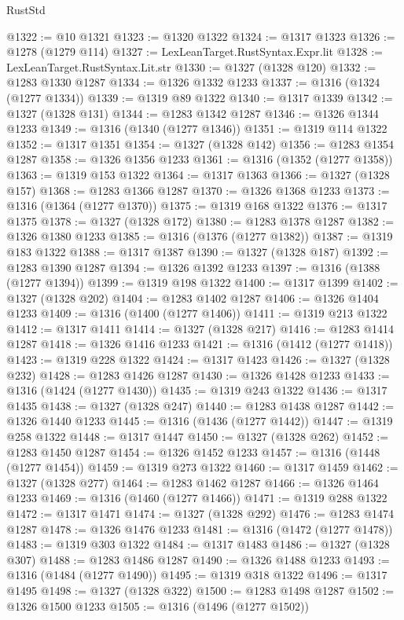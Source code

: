 \begin{lexlean}{RustStd}
\begin{coremodule}
@1322 := @10 @1321
@1323 := @1320 @1322
@1324 := @1317 @1323
@1326 := @1278 (@1279 @114)
@1327 := LexLeanTarget.RustSyntax.Expr.lit
@1328 := LexLeanTarget.RustSyntax.Lit.str
@1330 := @1327 (@1328 @120)
@1332 := @1283 @1330 @1287
@1334 := @1326 @1332 @1233
@1337 := @1316 (@1324 (@1277 @1334))
@1339 := @1319 @89 @1322
@1340 := @1317 @1339
@1342 := @1327 (@1328 @131)
@1344 := @1283 @1342 @1287
@1346 := @1326 @1344 @1233
@1349 := @1316 (@1340 (@1277 @1346))
@1351 := @1319 @114 @1322
@1352 := @1317 @1351
@1354 := @1327 (@1328 @142)
@1356 := @1283 @1354 @1287
@1358 := @1326 @1356 @1233
@1361 := @1316 (@1352 (@1277 @1358))
@1363 := @1319 @153 @1322
@1364 := @1317 @1363
@1366 := @1327 (@1328 @157)
@1368 := @1283 @1366 @1287
@1370 := @1326 @1368 @1233
@1373 := @1316 (@1364 (@1277 @1370))
@1375 := @1319 @168 @1322
@1376 := @1317 @1375
@1378 := @1327 (@1328 @172)
@1380 := @1283 @1378 @1287
@1382 := @1326 @1380 @1233
@1385 := @1316 (@1376 (@1277 @1382))
@1387 := @1319 @183 @1322
@1388 := @1317 @1387
@1390 := @1327 (@1328 @187)
@1392 := @1283 @1390 @1287
@1394 := @1326 @1392 @1233
@1397 := @1316 (@1388 (@1277 @1394))
@1399 := @1319 @198 @1322
@1400 := @1317 @1399
@1402 := @1327 (@1328 @202)
@1404 := @1283 @1402 @1287
@1406 := @1326 @1404 @1233
@1409 := @1316 (@1400 (@1277 @1406))
@1411 := @1319 @213 @1322
@1412 := @1317 @1411
@1414 := @1327 (@1328 @217)
@1416 := @1283 @1414 @1287
@1418 := @1326 @1416 @1233
@1421 := @1316 (@1412 (@1277 @1418))
@1423 := @1319 @228 @1322
@1424 := @1317 @1423
@1426 := @1327 (@1328 @232)
@1428 := @1283 @1426 @1287
@1430 := @1326 @1428 @1233
@1433 := @1316 (@1424 (@1277 @1430))
@1435 := @1319 @243 @1322
@1436 := @1317 @1435
@1438 := @1327 (@1328 @247)
@1440 := @1283 @1438 @1287
@1442 := @1326 @1440 @1233
@1445 := @1316 (@1436 (@1277 @1442))
@1447 := @1319 @258 @1322
@1448 := @1317 @1447
@1450 := @1327 (@1328 @262)
@1452 := @1283 @1450 @1287
@1454 := @1326 @1452 @1233
@1457 := @1316 (@1448 (@1277 @1454))
@1459 := @1319 @273 @1322
@1460 := @1317 @1459
@1462 := @1327 (@1328 @277)
@1464 := @1283 @1462 @1287
@1466 := @1326 @1464 @1233
@1469 := @1316 (@1460 (@1277 @1466))
@1471 := @1319 @288 @1322
@1472 := @1317 @1471
@1474 := @1327 (@1328 @292)
@1476 := @1283 @1474 @1287
@1478 := @1326 @1476 @1233
@1481 := @1316 (@1472 (@1277 @1478))
@1483 := @1319 @303 @1322
@1484 := @1317 @1483
@1486 := @1327 (@1328 @307)
@1488 := @1283 @1486 @1287
@1490 := @1326 @1488 @1233
@1493 := @1316 (@1484 (@1277 @1490))
@1495 := @1319 @318 @1322
@1496 := @1317 @1495
@1498 := @1327 (@1328 @322)
@1500 := @1283 @1498 @1287
@1502 := @1326 @1500 @1233
@1505 := @1316 (@1496 (@1277 @1502))

\end{coremodule}
\end{lexlean}
